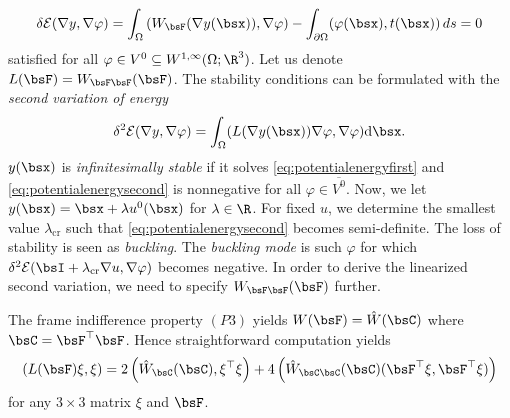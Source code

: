 \begin{align}\label{eq:potentialenergyfirst}
\delta \mathcal{E}(\nabla y, \nabla \varphi) = \int_{\Omega}  \left(W_{\bsF} (\nabla y(\bsx)),  \nabla \varphi \right) - \int_{\partial \Omega} (\varphi(\bsx), t(\bsx)) \mathop{ds} = 0
\end{align}
satisfied for all $\varphi \in V^0 \subseteq W^{1,\infty}(\Omega;\R^3)$. Let us denote $L(\bsF) = W_{\bsF \bsF}(\bsF)$.
The stability conditions can be formulated with the \emph{second variation of energy}
\begin{align}\label{eq:potentialenergysecond}
    \delta^2 \mathcal{E}(\nabla y, \nabla \varphi) = \int_{\Omega} (L( \nabla y(\bsx)) \nabla \varphi, \nabla \varphi) \mathrm{d\bsx}.
\end{align}
$y(\bsx)$ is \emph{infinitesimally stable} if it solves \eqref{eq:potentialenergyfirst} and \eqref{eq:potentialenergysecond} is nonnegative for all $\varphi \in \overline{V^0}$. Now, we let $ y(\bsx) = \bsx + \lambda u^0(\bsx) $ for $\lambda \in \R $. 
For fixed $u$, we determine the smallest value $\lambda_{\text{cr}}$ such that \eqref{eq:potentialenergysecond} becomes semi-definite. The loss of stability is seen as \emph{buckling}. The \emph{buckling mode} is such $\varphi $ for which $\delta^2 \mathcal{E}(\bsI + \lambda_{\text{cr}} \nabla u, \nabla \varphi) $ becomes negative.
In order to  derive the linearized second variation, we need to specify $W_{\bsF \bsF} (\bsF)$ further.





The frame indifference property $(P3)$ yields $W (\bsF) = \hat{W}(\bsC)$ where $\bsC = \bsF^\top \bsF$.
Hence straightforward computation yields
\begin{align}\label{eq:secondvariationL}
    \left( L(\bsF)\xi, \xi \right) = 2\left( \hat{W}_{\bsC}(\bsC), \xi^{\top} \xi  \right) + 4 \left( \hat W_{\bsC \bsC}(\bsC)(\bsF^{\top} \xi, \bsF^{\top} \xi) \right)
\end{align}
for any $3 \times 3$ matrix $\xi$ and $\bsF$.

